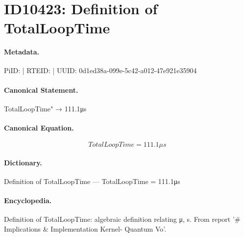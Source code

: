 \section*{ID10423: Definition of TotalLoopTime}
\paragraph{Metadata.}
PiID:  | RTEID:  | UUID: 0d1ed38a-099e-5c42-a012-47e921e35904

\paragraph{Canonical Statement.}
TotalLoopTime" → 111.1μs

\paragraph{Canonical Equation.}
\[
TotalLoopTime = 111.1μs
\]

\paragraph{Dictionary.}
Definition of TotalLoopTime — TotalLoopTime = 111.1μs

\paragraph{Encyclopedia.}
Definition of TotalLoopTime: algebraic definition relating μ, s. From report '\# Implications \& Implementation Kernel- Quantum Vo'.
